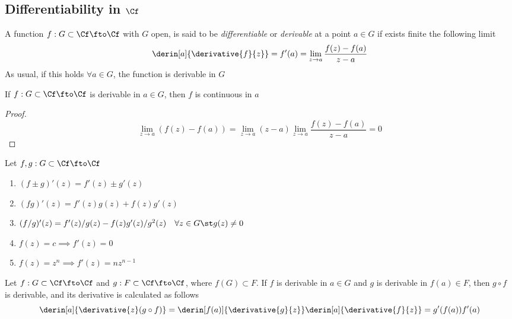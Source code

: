 \documentclass[../mmf.tex]{subfiles}
\begin{document}
\subsection{Differentiability in $\Cf$}
\begin{dfn}[Differentiability]
	A function $f:G\subset\Cf\fto\Cf$ with $G$ open, is said to be \textit{differentiable} or \textit{derivable} at a point $a\in G$ if exists finite the following limit
	\begin{equation}
		\derin[a]{\derivative{f}{z}}=f'(a)=\lim_{z\to a}\frac{f(z)-f(a)}{z-a}
		\label{eq:dercf}
	\end{equation}
	As usual, if this holds $\forall a\in G$, the function is derivable in $G$
\end{dfn}
\begin{thm}
	If $f:G\subset\Cf\fto\Cf$ is derivable in $a\in G$, then $f$ is continuous in $a$
\end{thm}
\begin{proof}
	\begin{equation*}
		\lim_{z\to a}(f(z)-f(a))=\lim_{z\to a}(z-a)\lim_{z\to a}\frac{f(z)-f(a)}{z-a}=0
	\end{equation*}
\end{proof}
\begin{thm}
	Let $f,g:G\subset\Cf\fto\Cf$
	\begin{enumerate}
	\item $(f\pm g)'(z)=f'(z)\pm g'(z)$
	\item $(fg)'(z)=f'(z)g(z)+f(z)g'(z)$
	\item $(f/g)'(z)=f'(z)/g(z)-f(z)g'(z)/g^2(z)\quad\forall z\in G\st g(z)\ne0$
	\item $f(z)=c\implies{} f'(z)=0$
	\item $f(z)=z^{n}\implies{} f'(z)=nz^{n-1}$
	\end{enumerate}
\end{thm}
\begin{thm}
	Let $f:G\subset\Cf\fto\Cf$ and $g:F\subset\Cf\fto\Cf$, where $f(G)\subset F$. If $f$ is derivable in $a\in G$ and $g$ is derivable in $f(a)\in F$, then $g\circ f$ is derivable, and its derivative is calculated as follows
	\begin{equation}
		\derin[a]{\derivative{z}(g\circ f)}=\derin[f(a)]{\derivative{g}{z}}\derin[a]{\derivative{f}{z}}=g'(f(a))f'(a)
		\label{eq:compositedercf}
	\end{equation}
\end{thm}
\end{document}

